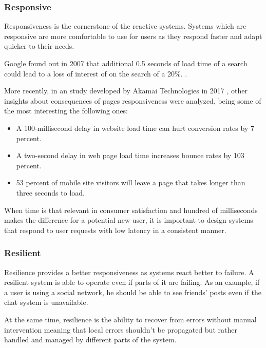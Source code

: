 \documentclass[../main.tex]{subfiles}
\begin{document}
\subsubsection{Responsive}

Responsiveness is the cornerstone of the reactive
systems. Systems which are responsive are more comfortable to use for users as
they respond faster and adapt quicker to their needs.

Google found out in 2007 that additional 0.5 seconds of load time of a search
could lead to a loss of interest of on the search of a 20\%. \autocite{MayerGoogleYouTube}.

More recently, in an study developed by Akamai Technologies in 2017 \autocite{Akamai2017TheAkamai}, other
insights about consequences of pages responsiveness were analyzed, being some of the most
interesting the following ones:

\begin{itemize}
    \item A 100-millisecond delay in website load time can hurt conversion rates
by 7 percent.

    \item A two-second delay in web page load time increases bounce rates by 103
percent.

    \item 53 percent of mobile site visitors will leave a page that takes longer
than three seconds to load.
\end{itemize}

When time is that relevant in consumer satisfaction and hundred of milliseconds
makes the difference for a potential new user, it is important to design systems
that respond to user requests with low latency in a consistent manner.

\subsubsection{Resilient}

Resilience provides a better responsiveness as systems
react better to failure. A resilient system is able to operate even if parts of
it are failing. As an example, if a user is using a social network, he should be
able to see friends' posts even if the chat system is unavailable.

At the same time, resilience is the ability to recover from errors without manual
intervention meaning that local errors shouldn't be propagated but rather handled and
managed by different parts of the system.
\end{document}
